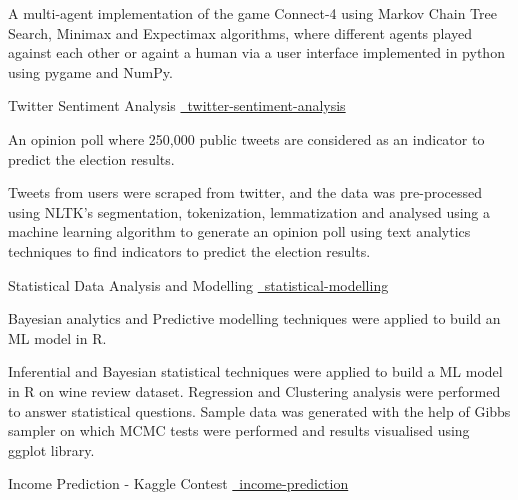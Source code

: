 \begin{cventries}
{\begin{cvitems}
{      }
      {
      A multi-agent implementation of the game Connect-4 using Markov Chain Tree Search, Minimax and Expectimax algorithms, where different agents played against each other or againt a human via a user interface implemented in python using pygame and NumPy.
      }
      \end{cvitems}
    }
  \cvproject
    {Twitter Sentiment Analysis}
    {
    {}
    {\href{https://github.com/mukeshmk/twitter-sentiment-analysis}{\faGithubSquare\ twitter-sentiment-analysis}}
    }
    {}
    {
      \begin{cvitems}
      \vspace{-0.5ex}
      {
      \item {An opinion poll where 250,000 public tweets are considered as an indicator to predict the election results.}
      }
      {
      Tweets from users were scraped from twitter, and the data was pre-processed using NLTK's segmentation, tokenization, lemmatization and analysed using a machine learning algorithm to generate an opinion poll using text analytics techniques to find indicators to predict the election results.
      }
      \end{cvitems}
    }
  \cvproject
    {Statistical Data Analysis and Modelling}
    {
    {}
    {\href{https://github.com/mukeshmk/statistical-modelling}{\faGithubSquare\ statistical-modelling}}
    }
    {}
    {
      \begin{cvitems}
      \vspace{-0.5ex}
      {
      \item {}Bayesian analytics and Predictive modelling techniques were applied to build an ML model in R.
      }
      {
      Inferential and Bayesian statistical techniques were applied to build a ML model in R on wine review dataset. Regression and Clustering analysis were performed to answer statistical questions. Sample data was generated with the help of Gibbs sampler on which MCMC tests were performed and results visualised using ggplot library.
      }
      \end{cvitems}
    }
  \cvproject
    {Income Prediction - Kaggle Contest}
    {
    {}
    {\href{https://github.com/mukeshmk/tcdml1920-income-ind}{\faGithubSquare\ income-prediction}}
}
\end{cventries}
